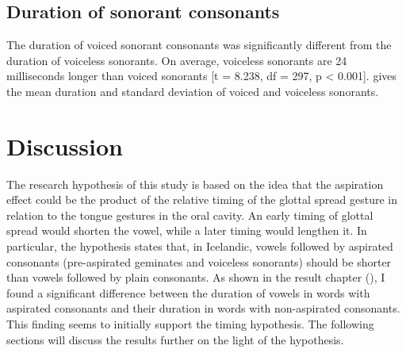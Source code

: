\documentclass[11pt,a4paper,oneside,openany]{memoir}\usepackage[]{graphicx}\usepackage[]{color}
\begin{document}
\section{Duration of sonorant consonants}
\label{s:sonorantdur}




The duration of voiced sonorant consonants was significantly different from the duration of voiceless sonorants.
On average, voiceless sonorants are 24 milliseconds longer than voiced sonorants [t = 8.238, df = 297, p < 0.001].
 gives the mean duration and standard deviation of voiced and voiceless sonorants.






\chapter{Discussion}
\label{c:discussion}

The research hypothesis of this study is based on the idea that the aspiration effect could be the product of the relative timing of the glottal spread gesture in relation to the tongue gestures in the oral cavity.
An early timing of glottal spread would shorten the vowel, while a later timing would lengthen it.
In particular, the hypothesis states that, in Icelandic, vowels followed by aspirated consonants (pre-aspirated geminates and voiceless sonorants) should be shorter than vowels followed by plain consonants.
As shown in the result chapter (), I found a significant difference between the duration of vowels in words with aspirated consonants and their duration in words with non-aspirated consonants.
This finding seems to initially support the timing hypothesis.
The following sections will discuss the results further on the light of the hypothesis.
\end{document}
